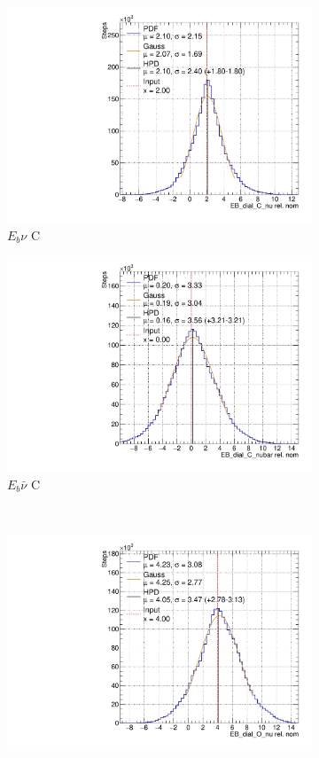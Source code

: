 \begin{figure}
\centering
\begin{subfigure}{.48\textwidth}
  \centering
  \includegraphics[width=0.73\linewidth]{figs/EB_dial_C_nuAsmv}
  \caption{$E_{b}\nu$ C}
\end{subfigure}
\begin{subfigure}{.48\textwidth}
  \centering
  \includegraphics[width=0.73\linewidth]{figs/EB_dial_C_nubarAsmv}
  \caption{$E_{b}\bar{\nu}$ C}
\end{subfigure} \\
\begin{subfigure}{.48\textwidth}
  \centering
  \includegraphics[width=0.73\linewidth]{figs/EB_dial_O_nuAsmv}

\end{subfigure}
\end{figure}
